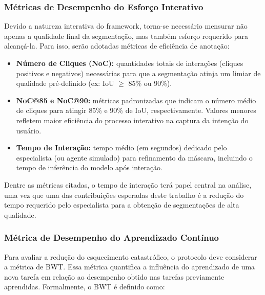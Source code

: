 \subsubsection{Métricas de Desempenho do Esforço Interativo}

Devido a natureza interativa do framework, torna-se necessário mensurar não apenas a qualidade final da segmentação, mas também esforço requerido para alcançá-la. Para isso, serão adotadas métricas de eficiência de anotação:

\begin{itemize}

\item \textbf{Número de Cliques (\ac{NoC}):} quantidades totais de interações (cliques positivos e negativos) necessárias para que a segmentação atinja um limiar de qualidade pré-definido (ex: \ac{IoU} $\ge$ 85\% ou 90\%).

\item \textbf{NoC@85 e NoC@90:} métricas padronizadas que indicam o número médio de cliques para atingir 85\% e 90\% de \ac{IoU}, respectivamente. Valores menores refletem maior eficiência do processo interativo na captura da intenção do usuário. %

\item \textbf{Tempo de Interação:} tempo médio (em segundos) dedicado pelo especialista (ou agente simulado) para refinamento da máscara, incluindo o tempo de inferência do modelo após interação.

\end{itemize}

Dentre as métricas citadas, o tempo de interação terá papel central na análise, uma vez que uma das contribuições esperadas deste trabalho é a redução do tempo requerido pelo especialista para a obtenção de segmentações de alta qualidade. %


\subsubsection{Métrica de Desempenho do Aprendizado Contínuo} %

Para avaliar a redução do esquecimento catastrófico, o protocolo deve considerar a métrica de \ac{BWT}. Essa métrica quantifica a influência do aprendizado de uma nova tarefa em relação ao desempenho obtido nas tarefas previamente aprendidas. Formalmente, o \ac{BWT} é definido como:


